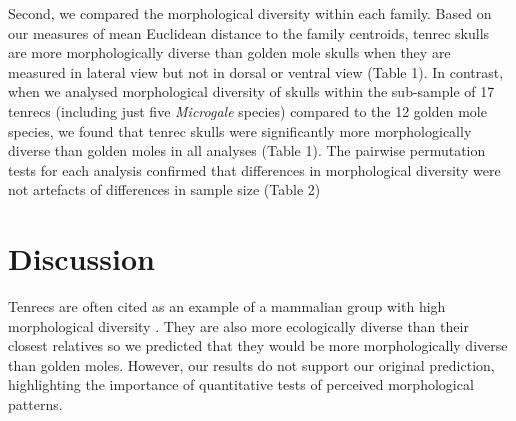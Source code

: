 \documentclass[12pt,a4paper]{article}
\begin{document}
	Second, we compared the morphological diversity within each family. Based on our measures of mean Euclidean distance to the family centroids, tenrec skulls are more morphologically diverse than golden mole skulls when they are measured in lateral view but not in dorsal or ventral view (Table 1). In contrast, when we analysed morphological diversity of skulls within the sub-sample of 17 tenrecs (including just five \textit{Microgale} species) compared to the 12 golden mole species, we found that tenrec skulls were significantly more morphologically diverse than golden moles in all analyses (Table 1). The pairwise permutation tests for each analysis confirmed that differences in morphological diversity were not artefacts of differences in sample size (Table 2)

\section{Discussion}

	Tenrecs are often cited as an example of a mammalian group with high morphological diversity \citep{Olson2013, Soarimalala2011, Eisenberg1969}. They are also more ecologically diverse than their closest relatives \citep{Soarimalala2011, Bronner1995} so we predicted that they would be more morphologically diverse than golden moles. However, our results do not support our original prediction, highlighting the importance of quantitative tests of perceived morphological patterns.
\end{document}

